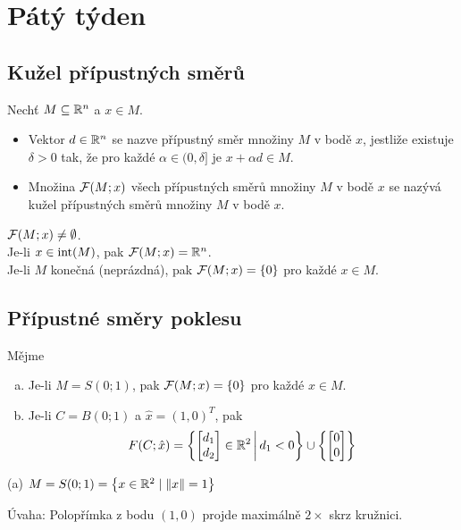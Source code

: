 \section{Pátý týden}

\subsection{Kužel přípustných směrů}
Nechť $M \subseteq \mathbb{R}^n$ a $x \in M$.
\begin{itemize}
    \item Vektor $d \in \mathbb{R}^n$ se nazve přípustný směr množiny $M$ v bodě $x$, jestliže existuje $\delta > 0$ tak, že pro
    každé $\alpha \in (0, \delta]$ je $x + \alpha d \in M$.
    \item Množina $\mathcal{F}(M; x)$ všech přípustných směrů množiny $M$ v bodě $x$ se nazývá kužel přípustných směrů množiny
    $M$ v bodě $x$.
\end{itemize}
$\mathcal{F}(M; x) \not = \emptyset$.\\
Je-li $x \in \operatorname{int}(M)$, pak $\mathcal{F}(M; x) = \mathbb{R}^n$.\\
Je-li $M$ konečná (neprázdná), pak $\mathcal{F}(M;x) = \left\lbrace 0 \right\rbrace$ pro každé $x \in M$.

\subsection{Přípustné směry poklesu}
Mějme
\begin{enumerate}[(a)]
    \item Je-li $M = S(0; 1)$, pak $\mathcal{F}(M;x) = \left\lbrace 0 \right\rbrace$ pro každé $x \in M$.
    \item Je-li $C = B(0; 1)$ a $\hat x = (1, 0)^T$, pak
    \[
        F(C; \hat x) = \left\lbrace 
            \begin{bmatrix}
                d_1 \\
                d_2
            \end{bmatrix} \in \mathbb{R}^2 \, \middle| \, d_1 < 0
         \right\rbrace \cup \left\lbrace 
            \begin{bmatrix}
                0 \\
                0
            \end{bmatrix}
         \right\rbrace
    \]
\end{enumerate}
(a) $M = S(0; 1) = \left\lbrace x \in \mathbb{R}^2 \mid \| x\| = 1 \right\rbrace$

Úvaha: Polopřímka z bodu $(1,0)$ projde maximálně $2 \times$ skrz kružnici.

